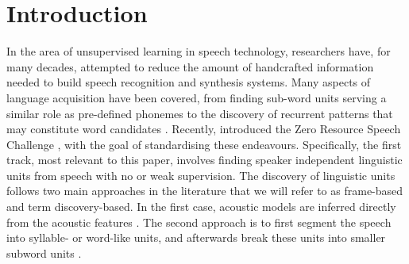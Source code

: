 \section{Introduction}
\label{sec:introduction}
In the area of unsupervised learning in speech technology, researchers have, for many decades, attempted to reduce the amount of handcrafted information needed to build speech recognition and synthesis systems.
Many aspects of language acquisition have been covered, from finding sub-word units serving a similar role as pre-defined phonemes \parencite{LeeEtAl1988,SvendsenEtAl1989,BacchianiEtAl1996,huijbregts2011unsupervised, OGrady:2008up} to the discovery of recurrent patterns that may constitute word candidates \cite{Rasanen2011149, park2008unsupervised, Aimetti2010, StoutenEtAl2008phonepatterns, DriesenEtAl2009adaptivenon-negative, gs:VanhainenAndSalvi2012Interspeech, gs:VanhainenAndSalvi2014ICASSP}.
Recently, \citeauthor{versteegh2015zero} introduced the Zero Resource Speech Challenge \parencite{versteegh2015zero}, with the goal of standardising these endeavours.
Specifically, the first track, most relevant to this paper, involves finding speaker independent linguistic units from speech with no or weak supervision.
The discovery of linguistic units follows two main approaches in the literature that we will refer to as frame-based and term discovery-based. 
In the first case, acoustic models are inferred directly from the acoustic features \parencite{varadarajan2008unsupervised, lee2012nonparametric, siu2014unsupervised, chen2015parallel, zhang2010towards, versteegh2016zero, heck2016unsupervised, synnaeve2016temporal}.
The second approach is to first segment the speech into syllable- or word-like units, and afterwards break these units into smaller subword units \parencite{jansen2013weak, park2008unsupervised, jansen2011efficient, versteegh2015zero, jansen2011towards, jansen2013weak, synnaeve2014phonetics, thiolliere2015hybrid, versteegh2016zero, zeghidour2016deep, kamper2015unsupervised, renshaw2015comparison}.

